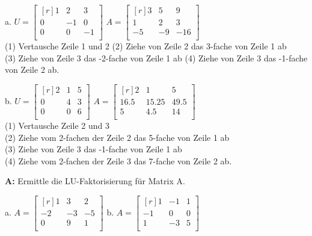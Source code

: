 \documentclass[landscape,twocolumn,a4paper]{article}
\begin{document}
a.
$U = \begin{bmatrix*}[r] 1 & 2 & 3\\  0 & -1 & 0\\ 0 & 0 & -1\\ \end{bmatrix*}$ \quad
 $A =\begin{bmatrix*}[r] 3 & 5 & 9\\  1 & 2 & 3\\ -5 & -9 & -16\\ \end{bmatrix*}$  \quad \\
 
 (1) Vertausche Zeile 1 und 2 \quad (2) Ziehe von Zeile 2 das 3-fache von Zeile 1 ab  \\
 (3)  Ziehe von Zeile 3 das -2-fache von Zeile 1 ab \quad (4)  Ziehe von Zeile 3 das -1-fache von Zeile 2 ab.
 \vspace{10pt}
 
b.
$U = \begin{bmatrix*}[r] 2 & 1 & 5\\  0 & 4 & 3\\ 0 & 0 & 6\\ \end{bmatrix*}$ \quad
 $A =\begin{bmatrix*}[r] 2 & 1 & 5\\  16.5 & 15.25 & 49.5\\ 5 & 4.5 & 14\\ \end{bmatrix*}$  \quad \\
 
 (1) Vertausche Zeile 2 und 3\\ (2) Ziehe vom 2-fachen der Zeile 2 das 5-fache von Zeile 1 ab  \\
 (3)  Ziehe von Zeile 3 das -1-fache von Zeile 1 ab \\
  (4)  Ziehe vom 2-fachen der Zeile 3 das 7-fache von Zeile 2 ab.
 \vspace{10pt}

\bigskip {}

\textbf{A:}   
Ermittle die LU-Faktorisierung für Matrix A.

a.  $A =\begin{bmatrix*}[r] 1 & 3 & 2\\  -2 & -3 & -5\\ 0 & 9 & 1\\ \end{bmatrix*}$  \quad 
b.  $A =\begin{bmatrix*}[r] 1 & -1 & 1\\  -1 & 0 & 0\\ 1 &-3 & 5\\ \end{bmatrix*}$  \quad 
\end{document}

